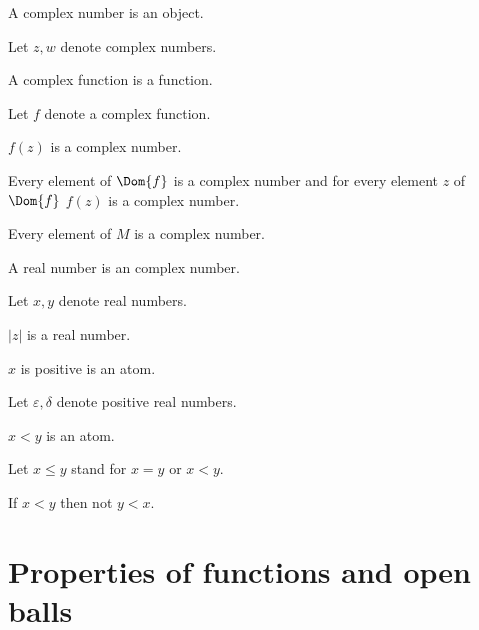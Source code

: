 \documentclass{article}
\begin{document}
  \begin{forthel}
    \begin{signature}
      A complex number is an object.
    \end{signature}

    Let $z, w$ denote complex numbers.

    \begin{signature}
      A complex function is a function.
    \end{signature}

    Let $f$ denote a complex function.

    \begin{signature}
      $f(z)$ is a complex number.
    \end{signature}

    \begin{axiom}
      Every element of $\Dom{f}$ is a complex number and for every element $z$ of $\Dom{f}$ $f(z)$ is a complex number.
    \end{axiom}

    \begin{axiom}
      Every element of $M$ is a complex number.
    \end{axiom}

    \begin{signature}
      A real number is an complex number.
    \end{signature}

    Let $x,y$ denote real numbers.

    \begin{signature}
      $|z|$ is a real number.
    \end{signature}

    \begin{signature}
      $x$ is positive is an atom.
    \end{signature}

    Let $\varepsilon, \delta$ denote positive real numbers.

    \begin{signature}
      $x < y$ is an atom.
    \end{signature}

    Let $x \leq y$ stand for $x = y$ or $x < y$.

    \begin{axiom}
      If $x < y$ then not $y < x$.
    \end{axiom}
  \end{forthel}

  \section{Properties of functions and open balls}
\end{document}
